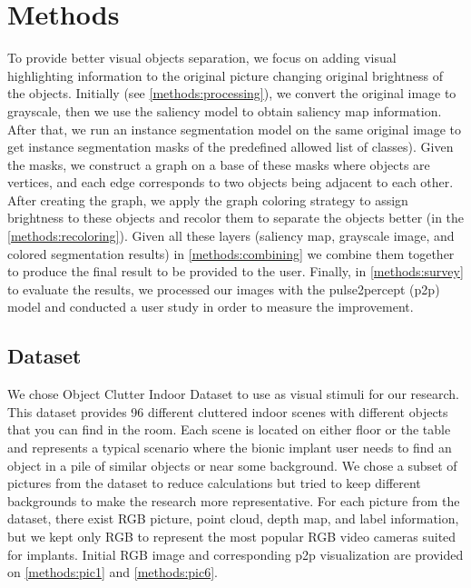 \section{Methods}
\label{methods:general}

To provide better visual objects separation, we focus on adding visual highlighting information to the original picture
changing original brightness of the objects. Initially (see \autoref{methods:processing}), we convert the original image to grayscale, then we use the saliency model to obtain saliency map information. After that, we run an instance segmentation model on the same original image to get instance segmentation masks of the predefined allowed list of classes). Given the masks, we construct a graph on a base of these masks where objects are vertices, and each edge corresponds to two objects being adjacent to each other. After creating the graph, we apply the graph coloring strategy to assign brightness to these objects and recolor them to separate the objects better (in the \autoref{methods:recoloring}). Given all these layers (saliency map, grayscale image, and colored segmentation results) in \autoref{methods:combining} we combine them together to produce the final result to be provided to the user. Finally, in {\autoref{methods:survey}} to evaluate the results, we processed our images with the pulse2percept (p2p) model and conducted a user study in order to measure the improvement.



\subsection{Dataset}
\label{methods:dataset}

We chose Object Clutter Indoor Dataset \cite{ociddataset} to use as visual stimuli for our research.
This dataset provides 96 different cluttered indoor scenes with different objects that you can find in the room. 
Each scene is located on either floor or the table and represents a typical scenario where the bionic implant user needs to find an object in a pile of similar objects or near some background. We chose a subset of pictures from the dataset to reduce calculations but tried to keep different backgrounds to make the research more representative.
For each picture from the dataset, there exist RGB picture, point cloud, depth map, and label information, but we kept only RGB to represent the most popular RGB video cameras suited for implants. Initial RGB image and corresponding p2p visualization are provided on \autoref{methods:pic1} and \autoref{methods:pic6}.

